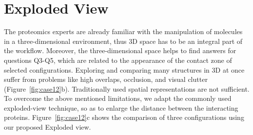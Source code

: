 \documentclass{bmcart}
\def\ExpView {Exploded view\xspace}
\def\MatView {Matrix view\xspace}
\begin{document}









\section{Exploded View}
The proteomics experts are already familiar with the manipulation of molecules in a three-dimensional environment, thus 3D space has to be an integral part of the workflow.
Moreover, the three-dimensional space helps to find answers for questions Q3-Q5, which are related to the appearance of the contact zone of selected configurations.
Exploring and comparing many structures in 3D at once suffer from problems like high overlaps, occlusion, and visual clutter (Figure~\ref{fig:case12}b). 
Traditionally used spatial representations are not sufficient.
To overcome the above mentioned limitations, we adapt the commonly used exploded-view technique, so as to enlarge the distance between the interacting proteins. 
Figure~\ref{fig:case12}c shows the comparison of three configurations using our proposed \ExpView.
\end{document}
